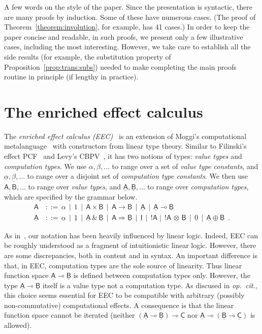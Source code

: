 \documentclass{LMCS}
\newcommand{\comptype}[1]{\underline{#1}}
\newcommand{\VconstA}{\alpha}
\newcommand{\VconstB}{\beta}
\newcommand{\CconstA}{\comptype{\alpha}}
\newcommand{\CconstB}{\comptype{\beta}}
\newcommand{\VA}{\mathsf{A}}
\newcommand{\VB}{\mathsf{B}}
\newcommand{\CA}{\comptype{\mathsf{A}}}
\newcommand{\CB}{\comptype{\mathsf{B}}}
\newcommand{\CC}{\comptype{\mathsf{C}}}
\newcommand{\CI}{\comptype{\mathsf{I}}}
\newcommand{\Vone}{1}
\newcommand{\Vprod}{\times}
\newcommand{\Vfun}{\to}
\newcommand{\lpop}{\multimap}
\newcommand{\Cone}{\comptype{1}}
\newcommand{\Cprod}{\,\&\,}
\newcommand{\Cfun}{\Rightarrow}
\newcommand{\Cbang}[1]{{! #1}}
\newcommand{\Ccopower}[2]{! #1 \, {\otimes} \, #2}
\newcommand{\Czero}{\comptype{0}}
\newcommand{\Cplus}{\oplus}
\begin{document}
A few words on the style of the paper. Since the presentation
is syntactic, there are many proofs by induction. Some of
these have numerous cases. (The proof of Theorem~\ref{theorem:involution}, for example,
has 41 cases.) In order to keep the paper concise and readable, in  such proofs, we 
present only a few illustrative cases, including the most interesting.
However, we take care to establish all the side results (for example, the
substitution property of Proposition~\ref{prop:trans:subs})  needed to make completing
the main proofs routine in principle (if lengthy in practice). 












\section{The enriched effect calculus}
\label{section:calculus}


The \emph{enriched effect calculus (EEC)}~\cite{EMS,EMSb} is an extension of Moggi's 
computational metalanguage~\cite{Moggi:91}
with constructors from linear type theory. 
Similar to Filinski's effect PCF~\cite{Filinski:phd}
and Levy's CBPV~\cite{Levy:book}, it has two notions of types: \emph{value types} and
\emph{computation types}.
We use $\VconstA, \VconstB, \dots$ to range over a 
set of \emph{value type constants}, and
$\CconstA,\CconstB,\dots$ to range over a 
disjoint set of \emph{computation type constants}.
We then use $\VA,\VB,\dots$ to range over 
\emph{value types}, and 
$\CA,\CB,\dots$ to range over \emph{computation types},
which are specified by the grammar below.
\begin{align*}
\VA \, & ::= \, \VconstA \,\mid \,\Vone \,\mid \,\VA \Vprod \VB \,\mid \,\VA \Vfun \VB \,\mid \, \CA \, \mid \, \CA  \lpop \CB \\
\CA \, & ::= \, \CconstA \,\mid \,\Cone \,\mid \,\CA \Cprod \CB \,\mid\, \VA \Cfun \CB \,\mid \, \CI \,\mid \, \Cbang{\VA} \mid  \, \Ccopower{\VA}{\CB} \, \mid \, \Czero \, \mid \, \CA \Cplus \CB \enspace .
\end{align*}

As in~\cite{EMS,EMSb}, our notation has been heavily influenced by linear logic.
Indeed, EEC can be roughly understood as a fragment of intuitionistic linear logic.
However, there are some discrepancies, both in content and in syntax.
An important difference is that, in EEC, computation types are the sole source of
linearity. Thus linear function space $\CA \lpop \CB$ is defined between computation types only. 
However, the type $\CA \lpop \CB$ itself is a value type not a computation type.
As discused in \emph{op.\ cit.}, this choice seems
essential for EEC to be compatible with arbitrary (possibly non-commutative) computational effects.
A consequence is that the linear
function space cannot be iterated 
(neither $(\CA \lpop \CB) \lpop \CC$ nor $\CA \lpop (\CB \lpop \CC)$ is allowed).
\end{document}
